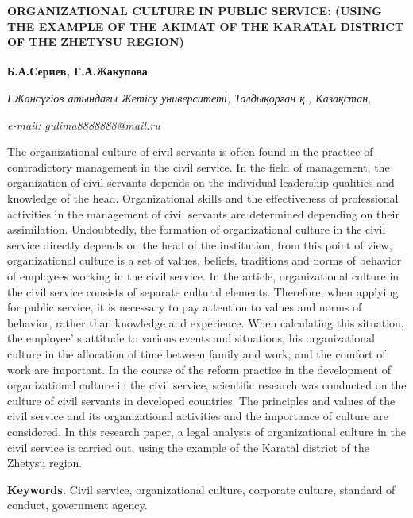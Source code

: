 \begin{articleheader}
{\bfseries ORGANIZATIONAL CULTURE IN PUBLIC SERVICE: (USING THE EXAMPLE OF THE AKIMAT OF THE KARATAL DISTRICT OF THE ZHETYSU REGION)}

{\bfseries
Б.А.Сериев,
Г.А.Жакупова\textsuperscript{\envelope }}
\end{articleheader}

\begin{affiliation}
\emph{І.Жансүгіов атындағы Жетісу университеті, Талдықорған қ., Қазақстан,}

\emph{e-mail: gulima8888888@mail.ru}
\end{affiliation}

The organizational culture of civil servants is often found in the
practice of contradictory management in the civil service. In the field
of management, the organization of civil servants depends on the
individual leadership qualities and knowledge of the head.
Organizational skills and the effectiveness of professional activities
in the management of civil servants are determined depending on their
assimilation. Undoubtedly, the formation of organizational culture in
the civil service directly depends on the head of the institution, from
this point of view, organizational culture is a set of values, beliefs,
traditions and norms of behavior of employees working in the civil
service. In the article, organizational culture in the civil service
consists of separate cultural elements. Therefore, when applying for
public service, it is necessary to pay attention to values and norms of
behavior, rather than knowledge and experience. When calculating this
situation, the employee' s attitude to various events and
situations, his organizational culture in the allocation of time between
family and work, and the comfort of work are important. In the course of
the reform practice in the development of organizational culture in the
civil service, scientific research was conducted on the culture of civil
servants in developed countries. The principles and values of the civil
service and its organizational activities and the importance of culture
are considered. In this research paper, a legal analysis of
organizational culture in the civil service is carried out, using the
example of the Karatal district of the Zhetysu region.

{\bfseries Keywords.} Civil service, organizational culture, corporate
culture, standard of conduct, government agency.

